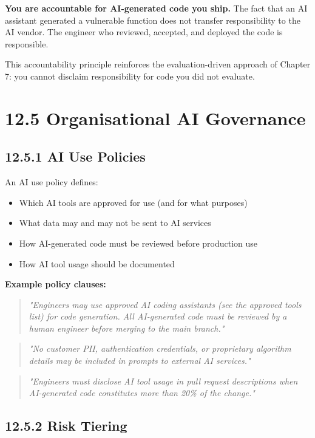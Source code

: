 \documentclass[11pt,a4paper]{book}
\begin{document}
\textbf{You are accountable for AI-generated code you ship.} The fact that an AI assistant generated a vulnerable function does not transfer responsibility to the AI vendor. The engineer who reviewed, accepted, and deployed the code is responsible.

This accountability principle reinforces the evaluation-driven approach of Chapter 7: you cannot disclaim responsibility for code you did not evaluate.

\medskip

\section{12.5 Organisational AI Governance}

\subsection{12.5.1 AI Use Policies}

An AI use policy defines:
\begin{itemize}
  \item Which AI tools are approved for use (and for what purposes)
  \item What data may and may not be sent to AI services
  \item How AI-generated code must be reviewed before production use
  \item How AI tool usage should be documented
\end{itemize}

\textbf{Example policy clauses:}

\begin{quote}
\textit{"Engineers may use approved AI coding assistants (see the approved tools list) for code generation. All AI-generated code must be reviewed by a human engineer before merging to the main branch."}
\end{quote}

\begin{quote}
\textit{"No customer PII, authentication credentials, or proprietary algorithm details may be included in prompts to external AI services."}
\end{quote}

\begin{quote}
\textit{"Engineers must disclose AI tool usage in pull request descriptions when AI-generated code constitutes more than 20\% of the change."}
\end{quote}

\subsection{12.5.2 Risk Tiering}
\end{document}

